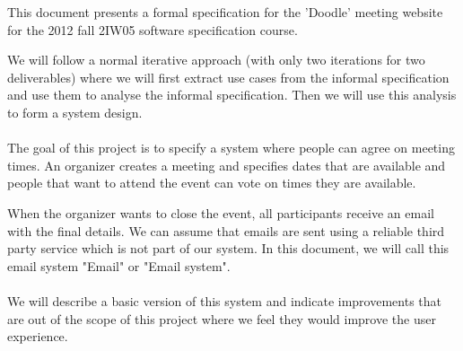 This document presents a formal specification for the 'Doodle' meeting website for the 2012 fall 2IW05 software specification course.

We will follow a normal iterative approach (with only two iterations for two deliverables) where we will first extract use cases from the informal specification and use them to analyse the informal specification. Then we will use this analysis to form a system design.

\paragraph{}
The goal of this project is to specify a system where people can agree on meeting times. An organizer creates a meeting and specifies dates that are available and people that want to attend the event can vote on times they are available.

When the organizer wants to close the event, all participants receive an email with the final details. We can assume that emails are sent using a reliable third party service which is not part of our system. In this document, we will call this email system "Email" or "Email system".

\paragraph{}
We will describe a basic version of this system and indicate improvements that are out of the scope of this project where we feel they would improve the user experience.
